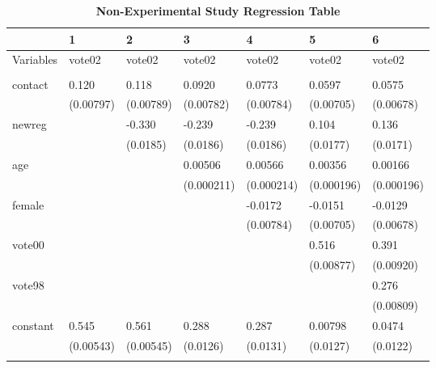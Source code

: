 \documentclass[a4paper]{article}
\begin{document}
\begin{table}[h!]
\caption{\textbf{Non-Experimental Study Regression Table}}
\begin{tabular}{|l|l|l|l|l|l|l|}
\hline
             & 1         & 2         & 3          & 4          & 5          & 6          \\ \hline
Variables    & vote02    & vote02    & vote02     & vote02     & vote02     & vote02     \\ \hline
             &           &           &            &            &            &            \\ \hline
contact  & 0.120     & 0.118     & 0.0920     & 0.0773     & 0.0597     & 0.0575     \\ \hline
             & (0.00797) & (0.00789) & (0.00782)  & (0.00784)  & (0.00705)  & (0.00678)  \\ \hline
newreg       &           & -0.330    & -0.239     & -0.239     & 0.104      & 0.136      \\ \hline
             &           & (0.0185)  & (0.0186)   & (0.0186)   & (0.0177)   & (0.0171)   \\ \hline
age          &           &           & 0.00506    & 0.00566    & 0.00356    & 0.00166    \\ \hline
             &           &           & (0.000211) & (0.000214) & (0.000196) & (0.000196) \\ \hline
female       &           &           &            & -0.0172    & -0.0151    & -0.0129    \\ \hline
             &           &           &            & (0.00784)  & (0.00705)  & (0.00678)  \\ \hline
vote00       &           &           &            &            & 0.516      & 0.391      \\ \hline
             &           &           &            &            & (0.00877)  & (0.00920)  \\ \hline
vote98       &           &           &            &            &            & 0.276      \\ \hline
             &           &           &            &            &            & (0.00809)  \\ \hline
constant     & 0.545     & 0.561     & 0.288      & 0.287      & 0.00798    & 0.0474     \\ \hline
             & (0.00543) & (0.00545) & (0.0126)   & (0.0131)   & (0.0127)   & (0.0122)   \\ \hline
             &           &           &            &            &            &            \\ \hline

\end{tabular}
\end{table}
\end{document}
